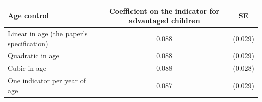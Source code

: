 \begin{tabular}{@{}lcc@{}}
\toprule
Age control & Coefficient on the indicator for advantaged children & SE \\
\midrule
Linear in age (the paper's specification) & 0.088 & (0.029) \\
Quadratic in age & 0.088 & (0.029) \\
Cubic in age & 0.088 & (0.028) \\
One indicator per year of age & 0.087 & (0.029) \\
\bottomrule
\end{tabular}
